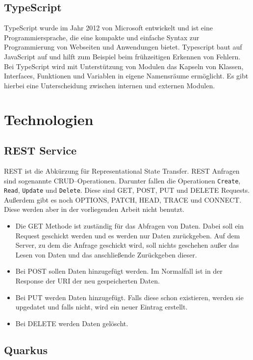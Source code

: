 \subsection{TypeScript}
TypeScript wurde im Jahr 2012 von Microsoft entwickelt und ist eine Programmiersprache, die eine kompakte und einfache Syntax zur Programmierung von Webseiten und Anwendungen bietet.
Typescript baut auf JavaScript auf und hilft zum Beispiel beim frühzeitigen Erkennen von Fehlern.
Bei TypeScript wird mit Unterstützung von Modulen das Kapseln von Klassen, Interfaces, Funktionen und Variablen in eigene Namensräume ermöglicht.
Es gibt hierbei eine Unterscheidung zwischen internen und externen Modulen.

\section{Technologien}

\subsection{REST Service}

REST ist die Abkürzung für Representational State Transfer.
REST Anfragen sind sogenannte CRUD–Operationen.
Darunter fallen die Operationen \texttt{Create}, \texttt{Read}, \texttt{Update} und \texttt{Delete}.
Diese sind GET, POST, PUT und DELETE Requests.
Außerdem gibt es noch OPTIONS, PATCH, HEAD, TRACE und CONNECT\@.
Diese werden aber in der vorliegenden Arbeit nicht benutzt.

\begin{itemize}
    \item Die GET Methode ist zuständig für das Abfragen von Daten.
    Dabei soll ein Request geschickt werden und es werden nur Daten zurückgeben.
    Auf dem Server, zu dem die Anfrage geschickt wird, soll nichts geschehen außer das Lesen von Daten und das anschließende Zurückgeben dieser.
    \item Bei POST sollen Daten hinzugefügt werden.
    Im Normalfall ist in der Response der URI der neu gespeicherten Daten.
    \item Bei PUT werden Daten hinzugefügt.
    Falls diese schon existieren, werden sie upgedatet und falls nicht, wird ein neuer Eintrag erstellt.
    \item Bei DELETE werden Daten gelöscht.
\end{itemize}

\subsection{Quarkus}\label{quarkus}

